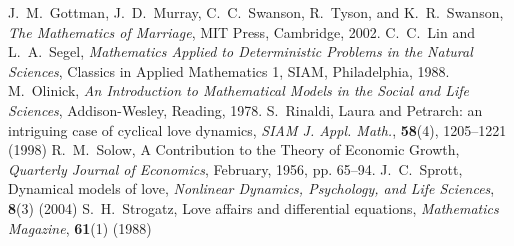\documentclass[reqno]{immbook}
\begin{document}
\backmatter

\begin{thebibliography}{99}
J.~M.~Gottman, J.~D.~Murray, C.~C.~Swanson,
R.~Tyson, and K.~R.~Swanson,
\emph{The Mathematics of Marriage},
MIT Press, Cambridge, 2002.
C.~C.~Lin and L.~A.~Segel,
\emph{Mathematics Applied to Deterministic
Problems in the Natural Sciences},
Classics in Applied Mathematics 1,
SIAM, Philadelphia, 1988.
M.~Olinick,
\emph{An Introduction to Mathematical Models
in the Social and Life Sciences},
Addison-Wesley, Reading, 1978.
S.~Rinaldi, Laura and Petrarch: an intriguing case of
cyclical love dynamics,
\emph{SIAM J. Appl. Math.}, \textbf{58}(4), 1205--1221 (1998)
R.~M.~Solow, A Contribution to the Theory of Economic Growth,
\emph{Quarterly Journal of Economics}, February, 1956, pp. 65--94.
J.~C.~Sprott,
Dynamical models of love,
\emph{Nonlinear Dynamics, Psychology, and Life Sciences},
\textbf{8}(3) (2004)
S.~H.~Strogatz, Love affairs and differential equations,
\emph{Mathematics Magazine}, \textbf{61}(1) (1988)
\end{thebibliography}
\printindex
\end{document}
